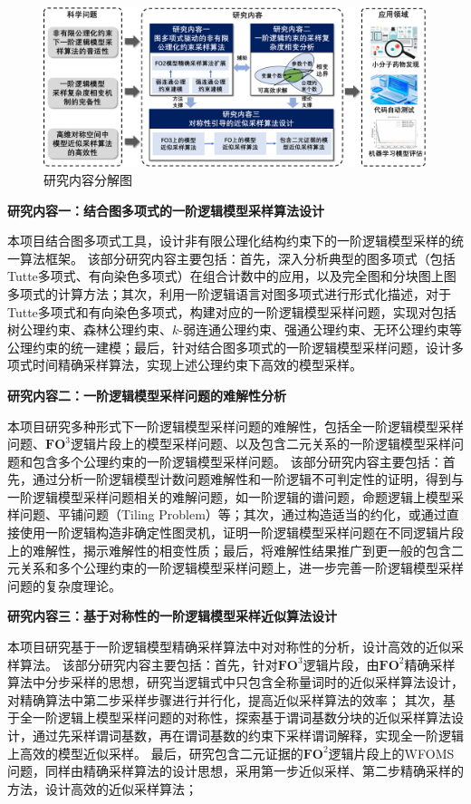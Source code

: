 \documentclass[12pt,UTF8,AutoFakeBold=3,a4paper]{ctexart} %
\newcommand{\fotwo}{\ensuremath{\mathbf{FO}^2}}
\newcommand{\fothree}{\ensuremath{\mathbf{FO}^3}}
\begin{document}
\begin{figure}[H]
  \centering
  \includegraphics[width=\textwidth]{figs/content.pdf}
  \caption{研究内容分解图}
  \label{fig:content}
\end{figure}

\textbf{研究内容一：结合图多项式的一阶逻辑模型采样算法设计}

本项目结合图多项式工具，设计非有限公理化结构约束下的一阶逻辑模型采样的统一算法框架。
该部分研究内容主要包括：首先，深入分析典型的图多项式（包括Tutte多项式、有向染色多项式）在组合计数中的应用，以及完全图和分块图上图多项式的计算方法；其次，利用一阶逻辑语言对图多项式进行形式化描述，对于Tutte多项式和有向染色多项式，构建对应的一阶逻辑模型采样问题，实现对包括树公理约束、森林公理约束、$k$-弱连通公理约束、强通公理约束、无环公理约束等公理约束的统一建模；最后，针对结合图多项式的一阶逻辑模型采样问题，设计多项式时间精确采样算法，实现上述公理约束下高效的模型采样。

\textbf{研究内容二：一阶逻辑模型采样问题的难解性分析}

本项目研究多种形式下一阶逻辑模型采样问题的难解性，包括全一阶逻辑模型采样问题、\fothree{}逻辑片段上的模型采样问题、以及包含二元关系的一阶逻辑模型采样问题和包含多个公理约束的一阶逻辑模型采样问题。
该部分研究内容主要包括：首先，通过分析一阶逻辑模型计数问题难解性和一阶逻辑不可判定性的证明，得到与一阶逻辑模型采样问题相关的难解问题，如一阶逻辑的谱问题，命题逻辑上模型采样问题、平铺问题（Tiling Problem）等；其次，通过构造适当的约化，或通过直接使用一阶逻辑构造非确定性图灵机，证明一阶逻辑模型采样问题在不同逻辑片段上的难解性，揭示难解性的相变性质；最后，将难解性结果推广到更一般的包含二元关系和多个公理约束的一阶逻辑模型采样问题上，进一步完善一阶逻辑模型采样问题的复杂度理论。

\textbf{研究内容三：基于对称性的一阶逻辑模型采样近似算法设计}

本项目研究基于一阶逻辑模型精确采样算法中对对称性的分析，设计高效的近似采样算法。
该部分研究内容主要包括：首先，针对\fothree{}逻辑片段，由\fotwo{}精确采样算法中分步采样的思想，研究当逻辑式中只包含全称量词时的近似采样算法设计，对精确算法中第二步采样步骤进行并行化，提高近似采样算法的效率；
其次，基于全一阶逻辑上模型采样问题的对称性，探索基于谓词基数分块的近似采样算法设计，通过先采样谓词基数，再在谓词基数的约束下采样谓词解释，实现全一阶逻辑上高效的模型近似采样。
最后，研究包含二元证据的\fotwo{}逻辑片段上的WFOMS问题，同样由精确采样算法的设计思想，采用第一步近似采样、第二步精确采样的方法，设计高效的近似采样算法；
\end{document}
